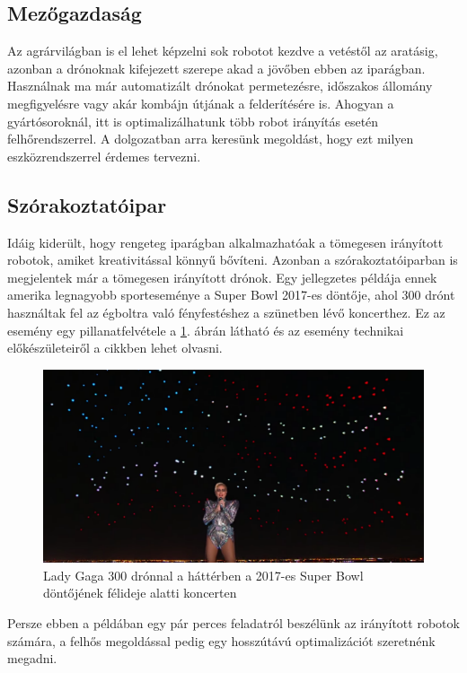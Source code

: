 \subsection{Mezőgazdaság}
Az agrárvilágban is el lehet képzelni sok robotot kezdve a vetéstől az aratásig, azonban a drónoknak kifejezett szerepe akad a jövőben ebben az iparágban. Használnak ma már automatizált drónokat permetezésre, időszakos állomány megfigyelésre vagy akár kombájn útjának a felderítésére is. Ahogyan a gyártósoroknál, itt is optimalizálhatunk több robot irányítás esetén felhőrendszerrel. A dolgozatban arra keresünk megoldást, hogy ezt milyen eszközrendszerrel érdemes tervezni.
\subsection{Szórakoztatóipar}
Idáig kiderült, hogy rengeteg iparágban alkalmazhatóak a tömegesen irányított robotok, amiket kreativitással könnyű bővíteni. Azonban a szórakoztatóiparban is megjelentek már a tömegesen irányított drónok. Egy jellegzetes példája ennek amerika legnagyobb sporteseménye a Super Bowl 2017-es döntője, ahol 300 drónt használtak fel az égboltra való fényfestéshez a szünetben lévő koncerthez. Ez az esemény egy pillanatfelvétele a \ref{fig:super-bowl}. ábrán látható és az esemény technikai előkészületeiről a \cite{concert} cikkben lehet olvasni.
\begin{figure}
	\centering
	\includegraphics[width=12cm]{figures/super_bowl.png}
	\caption{Lady Gaga 300 drónnal a háttérben a 2017-es Super Bowl döntőjének félideje alatti koncerten \cite{super-bowl-pic}}
	\label{fig:super-bowl}
\end{figure}
Persze ebben a példában egy pár perces feladatról beszélünk az irányított robotok számára, a felhős megoldással pedig egy hosszútávú optimalizációt szeretnénk megadni.

